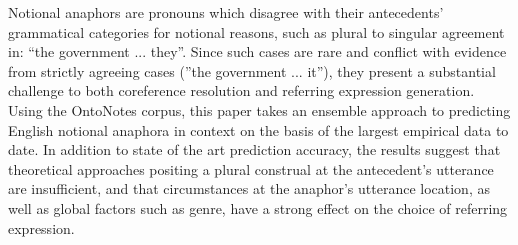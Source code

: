 Notional anaphors are pronouns which disagree with their antecedents' grammatical categories for notional reasons, such as plural to singular agreement in: ``the government ... they''. Since such cases are rare and conflict with evidence from strictly agreeing cases (''the government ... it''), they present a substantial challenge to both coreference resolution and referring expression generation. Using the OntoNotes corpus, this paper takes an ensemble approach to predicting English notional anaphora in context on the basis of the largest empirical data to date. In addition to state of the art prediction accuracy, the results suggest that theoretical approaches positing a plural construal at the antecedent's utterance are insufficient, and that circumstances at the anaphor's utterance location, as well as global factors such as genre, have a strong effect on the choice of referring expression.
